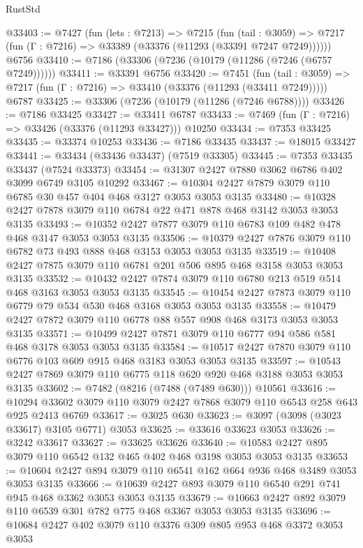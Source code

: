 \begin{lexlean}{RustStd}
\begin{coremodule}
@33403 := @7427
    (fun (lets : @7213) =>
    @7215
      (fun (tail : @3059) =>
      @7217 (fun (Γ : @7216) => @33389 (@33376 (@11293 (@33391 @7247 @7249))))))
    @6756
@33410 := @7186 (@33306 (@7236 (@10179 (@11286 (@7246 (@6757 @7249))))))
@33411 := @33391 @6756
@33420 := @7451
    (fun (tail : @3059) => @7217 (fun (Γ : @7216) => @33410 (@33376 (@11293 (@33411 @7249)))))
    @6787
@33425 := @33306 (@7236 (@10179 (@11286 (@7246 @6788))))
@33426 := @7186 @33425
@33427 := @33411 @6787
@33433 := @7469 (fun (Γ : @7216) => @33426 (@33376 (@11293 @33427))) @10250
@33434 := @7353 @33425
@33435 := @33374 @10253
@33436 := @7186 @33435
@33437 := @18015 @33427
@33441 := @33434 (@33436 @33437) (@7519 @33305)
@33445 := @7353 @33435 @33437 (@7524 @33373)
@33454 := @31307 @2427 @7880 @3062 @6786 @402 @3099 @6749 @3105 @10292
@33467 := @10304 @2427 @7879 @3079 @110 @6785 @30 @457 @404 @468 @3127 @3053 @3053 @3135
@33480 := @10328 @2427 @7878 @3079 @110 @6784 @22 @471 @878 @468 @3142 @3053 @3053 @3135
@33493 := @10352 @2427 @7877 @3079 @110 @6783 @109 @482 @478 @468 @3147 @3053 @3053 @3135
@33506 := @10379 @2427 @7876 @3079 @110 @6782 @73 @493 @888 @468 @3153 @3053 @3053 @3135
@33519 := @10408 @2427 @7875 @3079 @110 @6781 @201 @506 @895 @468 @3158 @3053 @3053 @3135
@33532 := @10432 @2427 @7874 @3079 @110 @6780 @213 @519 @514 @468 @3163 @3053 @3053 @3135
@33545 := @10454 @2427 @7873 @3079 @110 @6779 @79 @534 @530 @468 @3168 @3053 @3053 @3135
@33558 := @10479 @2427 @7872 @3079 @110 @6778 @88 @557 @908 @468 @3173 @3053 @3053 @3135
@33571 := @10499 @2427 @7871 @3079 @110 @6777 @94 @586 @581 @468 @3178 @3053 @3053 @3135
@33584 := @10517 @2427 @7870 @3079 @110 @6776 @103 @609 @915 @468 @3183 @3053 @3053 @3135
@33597 := @10543 @2427 @7869 @3079 @110 @6775 @118 @620 @920 @468 @3188 @3053 @3053 @3135
@33602 := @7482 (@8216 (@7488 (@7489 @630))) @10561
@33616 := @10294 @33602 @3079 @110 @3079 @2427 @7868 @3079 @110 @6543 @258 @643 @925 @2413 @6769
@33617 := @3025 @630
@33623 := @3097 (@3098 (@3023 @33617) @3105 @6771) @3053
@33625 := @33616 @33623 @3053
@33626 := @3242 @33617
@33627 := @33625 @33626
@33640 := @10583 @2427 @895 @3079 @110 @6542 @132 @465 @402 @468 @3198 @3053 @3053 @3135
@33653 := @10604 @2427 @894 @3079 @110 @6541 @162 @664 @936 @468 @3489 @3053 @3053 @3135
@33666 := @10639 @2427 @893 @3079 @110 @6540 @291 @741 @945 @468 @3362 @3053 @3053 @3135
@33679 := @10663 @2427 @892 @3079 @110 @6539 @301 @782 @775 @468 @3367 @3053 @3053 @3135
@33696 := @10684
    @2427
    @402
    @3079
    @110
    @3376
    @309
    @805
    @953
    @468
    @3372
    @3053
    @3053

\end{coremodule}
\end{lexlean}
